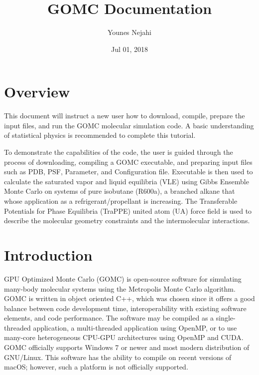 \documentclass[letterpaper,10pt,english]{sphinxmanual}
\title{GOMC Documentation}
\date{Jul 01, 2018}
\author{Younes Nejahi}
\begin{document}
\maketitle
\sphinxtableofcontents
{}\label{\detokenize{index::doc}}



\chapter{Overview}
\label{\detokenize{overview:overview}}\label{\detokenize{overview::doc}}
This document will instruct a new user how to download, compile, prepare the input files, and run the GOMC molecular simulation code. A basic understanding of statistical physics is recommended to complete this tutorial.

To demonstrate the capabilities of the code, the user is guided through the process of downloading, compiling a GOMC executable, and preparing input files such as PDB, PSF, Parameter, and Configuration file. Executable is then used to calculate the saturated vapor and liquid equilibria (VLE) using Gibbs Ensemble Monte Carlo on systems of pure isobutane (R600a), a branched alkane that whose application as a refrigerant/propellant is increasing. The Transferable Potentials for Phase Equilibria (TraPPE) united atom (UA) force field is used to describe the molecular geometry constraints and the intermolecular interactions.



\chapter{Introduction}
\label{\detokenize{introduction:introduction}}\label{\detokenize{introduction::doc}}
GPU Optimized Monte Carlo (GOMC) is open-source software for simulating many-body molecular systems using the Metropolis Monte Carlo algorithm. GOMC is written in object oriented C++, which was chosen since it offers a good balance between code development time, interoperability with existing software elements, and code performance. The software may be compiled as a single-threaded application, a multi-threaded application using OpenMP, or to use many-core heterogeneous CPU-GPU architectures using OpenMP and CUDA. GOMC officially supports Windows 7 or newer and most modern distribution of GNU/Linux. This software has the ability to compile on recent versions of macOS; however, such a platform is not officially supported.
\end{document}
